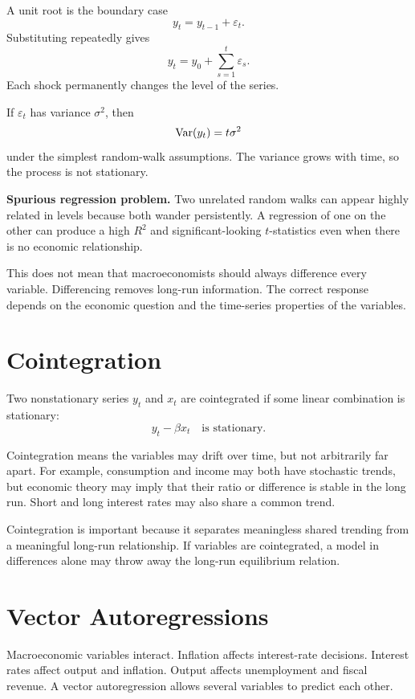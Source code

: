 A unit root is the boundary case
\[
    y_t=y_{t-1}+\varepsilon_t.
\]
Substituting repeatedly gives
\[
    y_t=y_0+\sum_{s=1}^{t}\varepsilon_s.
\]
Each shock permanently changes the level of the series.

If \(\varepsilon_t\) has variance \(\sigma^2\), then
\[
    \mathrm{Var}(y_t)=t\sigma^2
\]
under the simplest random-walk assumptions. The variance grows with time, so the process is not stationary.

\begin{boxF}
\textbf{Spurious regression problem.} Two unrelated random walks can appear highly related in levels because both wander persistently. A regression of one on the other can produce a high \(R^2\) and significant-looking \(t\)-statistics even when there is no economic relationship.
\end{boxF}

This does not mean that macroeconomists should always difference every variable. Differencing removes long-run information. The correct response depends on the economic question and the time-series properties of the variables.

\section{Cointegration}

\begin{defN}[Cointegration]
Two nonstationary series \(y_t\) and \(x_t\) are cointegrated if some linear combination is stationary:
\[
    y_t-\beta x_t
    \quad \text{is stationary}.
\]
\end{defN}

Cointegration means the variables may drift over time, but not arbitrarily far apart. For example, consumption and income may both have stochastic trends, but economic theory may imply that their ratio or difference is stable in the long run. Short and long interest rates may also share a common trend.

Cointegration is important because it separates meaningless shared trending from a meaningful long-run relationship. If variables are cointegrated, a model in differences alone may throw away the long-run equilibrium relation.

\section{Vector Autoregressions}

Macroeconomic variables interact. Inflation affects interest-rate decisions. Interest rates affect output and inflation. Output affects unemployment and fiscal revenue. A vector autoregression allows several variables to predict each other.

